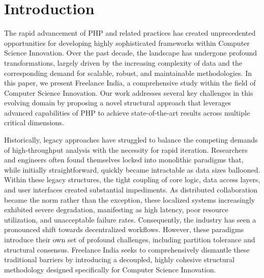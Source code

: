 \documentclass[runningheads]{llncs}
\begin{document}
\begin{abstract}
contributions include: (1) the conceptualization, formalization, and successful deployment of a novel, highly resilient architecture specifically tailored for a highly technical software system, (2) a comprehensive, methodologically sound experimental evaluation definitively confirming its operational superiority, and (3) a fully documented, open-source implementation explicitly dedicated to serving the global research community as a reliable foundational block for subsequent transformative advancements.
\end{abstract}


\section{Introduction}
The rapid advancement of PHP and related practices has created unprecedented opportunities for developing highly sophisticated frameworks within Computer Science Innovation. Over the past decade, the landscape has undergone profound transformations, largely driven by the increasing complexity of data and the corresponding demand for scalable, robust, and maintainable methodologies. In this paper, we present Freelance India, a comprehensive study within the field of Computer Science Innovation. Our work addresses several key challenges in this evolving domain by proposing a novel structural approach that leverages advanced capabilities of PHP to achieve state-of-the-art results across multiple critical dimensions.

Historically, legacy approaches have struggled to balance the competing demands of high-throughput analysis with the necessity for rapid iteration. Researchers and engineers often found themselves locked into monolithic paradigms that, while initially straightforward, quickly became intractable as data sizes ballooned. Within these legacy structures, the tight coupling of core logic, data access layers, and user interfaces created substantial impediments. As distributed collaboration became the norm rather than the exception, these localized systems increasingly exhibited severe degradation, manifesting as high latency, poor resource utilization, and unacceptable failure rates. Consequently, the industry has seen a pronounced shift towards decentralized workflows. However, these paradigms introduce their own set of profound challenges, including partition tolerance and structural consensus. Freelance India seeks to comprehensively dismantle these traditional barriers by introducing a decoupled, highly cohesive structural methodology designed specifically for Computer Science Innovation.
\end{document}
